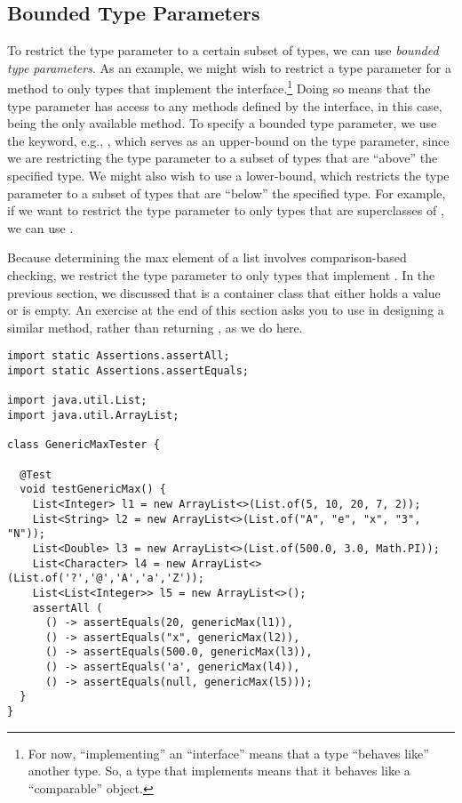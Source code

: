 \subsection{Bounded Type Parameters}
To restrict the type parameter to a certain subset of types, we can use \emph{bounded type parameters}. 
As an example, we might wish to restrict a type parameter for a method to only types that implement the  interface.\footnote{For now, ``implementing'' an ``interface'' means that a type ``behaves like'' another type. So, a type that implements  means that it behaves like a ``comparable'' object.} 
Doing so means that the type parameter has access to any methods defined by the interface, in this case,  being the only available method. 
To specify a bounded type parameter, we use the  keyword, e.g., , which serves as an upper-bound on the type parameter, since we are restricting the type parameter to a subset of types that are ``above'' the specified type. 
We might also wish to use a lower-bound, which restricts the type parameter to a subset of types that are ``below'' the specified type. 
For example, if we want to restrict the type parameter to only types that are superclasses of , we can use .

Because determining the max element of a list involves comparison-based checking, we restrict the type parameter to only types that implement . 
In the previous section, we discussed that  is a container class that either holds a value or is empty.
An exercise at the end of this section asks you to use  in designing a similar method, rather than returning , as we do here.

\enlargethispage{-7\baselineskip}
\begin{lstlisting}[language=MyJava]
import static Assertions.assertAll;
import static Assertions.assertEquals;

import java.util.List;
import java.util.ArrayList;

class GenericMaxTester {
  
  @Test 
  void testGenericMax() {
    List<Integer> l1 = new ArrayList<>(List.of(5, 10, 20, 7, 2));
    List<String> l2 = new ArrayList<>(List.of("A", "e", "x", "3", "N"));
    List<Double> l3 = new ArrayList<>(List.of(500.0, 3.0, Math.PI));
    List<Character> l4 = new ArrayList<>(List.of('?','@','A','a','Z'));
    List<List<Integer>> l5 = new ArrayList<>();
    assertAll (
      () -> assertEquals(20, genericMax(l1)),
      () -> assertEquals("x", genericMax(l2)),
      () -> assertEquals(500.0, genericMax(l3)),
      () -> assertEquals('a', genericMax(l4)),
      () -> assertEquals(null, genericMax(l5)));
  }
}
\end{lstlisting}

